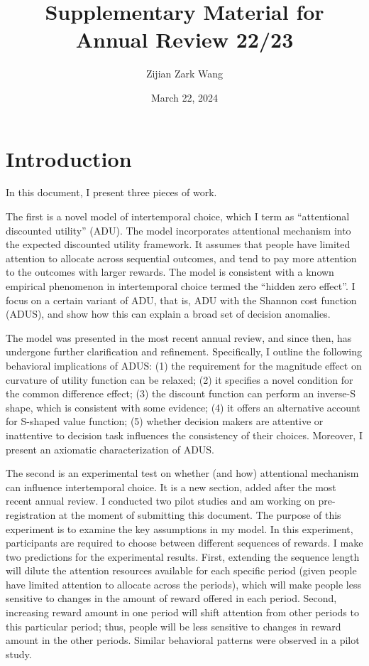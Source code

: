 \documentclass[
  12pt,
]{article}
\title{Supplementary Material for Annual Review 22/23}
\author{Zijian Zark Wang}
\date{March 22, 2024}
\begin{document}
\maketitle

\hypertarget{introduction}{%
\section{Introduction}\label{introduction}}

In this document, I present three pieces of work.

The first is a novel model of intertemporal choice, which I term as
``attentional discounted utility'' (ADU). The model incorporates
attentional mechanism into the expected discounted utility framework. It
assumes that people have limited attention to allocate across sequential
outcomes, and tend to pay more attention to the outcomes with larger
rewards. The model is consistent with a known empirical phenomenon in
intertemporal choice termed the ``hidden zero effect''. I focus on a
certain variant of ADU, that is, ADU with the Shannon cost function
(ADUS), and show how this can explain a broad set of decision anomalies.

The model was presented in the most recent annual review, and since
then, has undergone further clarification and refinement. Specifically,
I outline the following behavioral implications of ADUS: (1) the
requirement for the magnitude effect on curvature of utility function
can be relaxed; (2) it specifies a novel condition for the common
difference effect; (3) the discount function can perform an inverse-S
shape, which is consistent with some evidence; (4) it offers an
alternative account for S-shaped value function; (5) whether decision
makers are attentive or inattentive to decision task influences the
consistency of their choices. Moreover, I present an axiomatic
characterization of ADUS.

The second is an experimental test on whether (and how) attentional
mechanism can influence intertemporal choice. It is a new section, added
after the most recent annual review. I conducted two pilot studies and
am working on pre-registration at the moment of submitting this
document. The purpose of this experiment is to examine the key
assumptions in my model. In this experiment, participants are required
to choose between different sequences of rewards. I make two predictions
for the experimental results. First, extending the sequence length will
dilute the attention resources available for each specific period (given
people have limited attention to allocate across the periods), which
will make people less sensitive to changes in the amount of reward
offered in each period. Second, increasing reward amount in one period
will shift attention from other periods to this particular period; thus,
people will be less sensitive to changes in reward amount in the other
periods. Similar behavioral patterns were observed in a pilot study.
\end{document}
